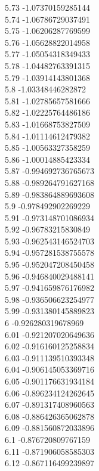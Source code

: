 {5.73	-1.07370159285144\\
5.74	-1.06786729037491\\
5.75	-1.06206287769599\\
5.76	-1.05628822014958\\
5.77	-1.05054318349433\\
5.78	-1.04482763391315\\
5.79	-1.03914143801368\\
5.8	-1.03348446282872\\
5.81	-1.02785657581666\\
5.82	-1.02225764486186\\
5.83	-1.01668753827509\\
5.84	-1.01114612479382\\
5.85	-1.00563327358259\\
5.86	-1.00014885423334\\
5.87	-0.994692736765673\\
5.88	-0.989264791627168\\
5.89	-0.983864889693608\\
5.9	-0.978492902269229\\
5.91	-0.973148701086934\\
5.92	-0.96783215830849\\
5.93	-0.962543146524703\\
5.94	-0.957281538755578\\
5.95	-0.952047208450458\\
5.96	-0.946840029488141\\
5.97	-0.941659876176982\\
5.98	-0.936506623254977\\
5.99	-0.931380145889823\\
6	-0.926280319678969\\
6.01	-0.921207020649636\\
6.02	-0.916160125258834\\
6.03	-0.911139510393348\\
6.04	-0.906145053369716\\
6.05	-0.901176631934184\\
6.06	-0.896234124262645\\
6.07	-0.891317408960563\\
6.08	-0.886426365062878\\
6.09	-0.881560872033896\\
6.1	-0.876720809767159\\
6.11	-0.871906058585303\\
6.12	-0.867116499239897\\
}
